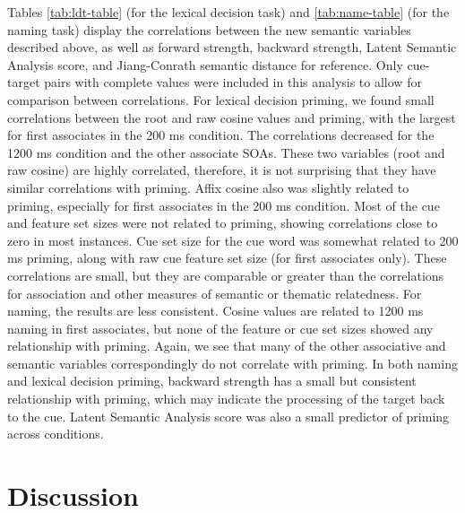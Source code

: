 \documentclass[english,,man]{apa6}
\begin{document}
Tables \ref{tab:ldt-table} (for the lexical decision task) and \ref{tab:name-table} (for the naming task) display the correlations between the new semantic variables described above, as well as forward strength, backward strength, Latent Semantic Analysis score, and Jiang-Conrath semantic distance for reference. Only cue-target pairs with complete values were included in this analysis to allow for comparison between correlations. For lexical decision priming, we found small correlations between the root and raw cosine values and priming, with the largest for first associates in the 200 ms condition. The correlations decreased for the 1200 ms condition and the other associate SOAs. These two variables (root and raw cosine) are highly correlated, therefore, it is not surprising that they have similar correlations with priming. Affix cosine also was slightly related to priming, especially for first associates in the 200 ms condition. Most of the cue and feature set sizes were not related to priming, showing correlations close to zero in most instances. Cue set size for the cue word was somewhat related to 200 ms priming, along with raw cue feature set size (for first associates only). These correlations are small, but they are comparable or greater than the correlations for association and other measures of semantic or thematic relatedness. For naming, the results are less consistent. Cosine values are related to 1200 ms naming in first associates, but none of the feature or cue set sizes showed any relationship with priming. Again, we see that many of the other associative and semantic variables correspondingly do not correlate with priming. In both naming and lexical decision priming, backward strength has a small but consistent relationship with priming, which may indicate the processing of the target back to the cue. Latent Semantic Analysis score was also a small predictor of priming across conditions.

\hypertarget{discussion}{%
\section{Discussion}\label{discussion}}
\end{document}

